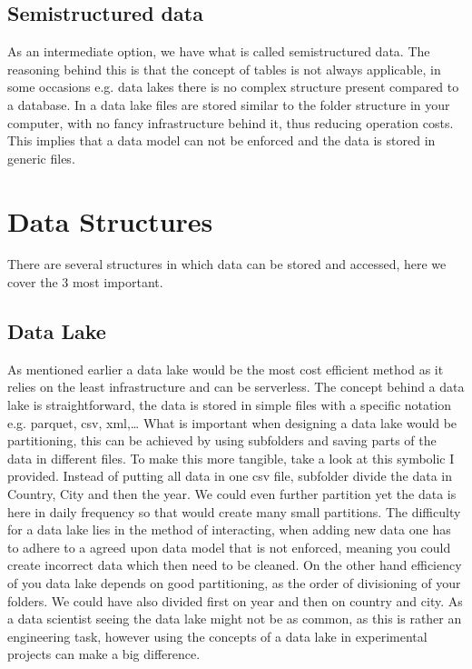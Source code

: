 \documentclass[letterpaper,10pt,english]{jupyterBook}
\begin{document}
\subsection{Semi\sphinxhyphen{}structured data}
\label{\detokenize{c1_introduction/introduction:semi-structured-data}}
\sphinxAtStartPar
As an intermediate option, we have what is called semi\sphinxhyphen{}structured data.
The reasoning behind this is that the concept of tables is not always applicable, in some occasions e.g. data lakes there is no complex structure present compared to a database.
In a data lake files are stored similar to the folder structure in your computer, with no fancy infrastructure behind it, thus reducing operation costs.
This implies that a data model can not be enforced and the data is stored in generic files.


\section{Data Structures}
\label{\detokenize{c1_introduction/introduction:data-structures}}
\sphinxAtStartPar
There are several structures in which data can be stored and accessed, here we cover the 3 most important.


\subsection{Data Lake}
\label{\detokenize{c1_introduction/introduction:data-lake}}
\sphinxAtStartPar
As mentioned earlier a data lake would be the most cost efficient method as it relies on the least infrastructure and can be serverless.
The concept behind a data lake is straight\sphinxhyphen{}forward, the data is stored in simple files with a specific notation e.g. parquet, csv, xml,…
What is important when designing a data lake would be partitioning, this can be achieved by using subfolders and saving parts of the data in different files.
To make this more tangible, take a look at this symbolic  I provided.
Instead of putting all data in one csv file, subfolder divide the data in Country, City and then the year.
We could even further partition yet the data is here in daily frequency so that would create many small partitions.
The difficulty for a data lake lies in the method of interacting, when adding new data one has to adhere to a agreed upon data model that is not enforced, meaning you could create incorrect data which then need to be cleaned.
On the other hand efficiency of you data lake depends on good partitioning, as the order of divisioning of your folders. We could have also divided first on year and then on country and city.
As a data scientist seeing the data lake might not be as common, as this is rather an engineering task, however using the concepts of a data lake in experimental projects can make a big difference.
\end{document}
